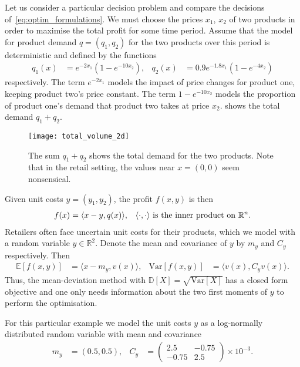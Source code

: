 \documentclass[main.tex]{subfiles}
\begin{document}
\begin{example}
  Let us consider a particular decision problem and compare the
  decisions of~\eqref{eq:optim_formulations}.
  We must choose the prices $x_1$, $x_2$ of two products in order to
  maximise the total profit for some time period.
  Assume that the model for product demand $q=(q_1,q_2)$ for the two products over
  this period is
  deterministic and defined by the functions
  \begin{align}
    q_1(x) &= e^{-2x_1}(1-e^{-10x_2}),
    &q_2(x)&= 0.9e^{-1.8x_1}(1-e^{-4x_2})
  \end{align}
  respectively.
  The term $e^{-2x_1}$  models the impact of price
  changes for product one, keeping product two's price constant.
  The term $1-e^{-10x_2}$ models the proportion of product one's
  demand that product two takes at price $x_2$.
   shows the total demand $q_1+q_2$.
  \begin{figure}[htbp]
    \centering
    \texttt{[image: total\_volume\_2d]}
    \caption{The sum $q_1+q_2$ shows the total demand for the two products.
      Note that in the retail setting, the values near $x=(0,0)$ seem
      nonsensical.}\label{fig:total_volume_2d}
  \end{figure}

  Given unit costs $y=(y_1,y_2)$, the profit $f(x,y)$ is then
  \begin{align}
    f(x)
    &=\langle x-y,q(x) \rangle,
    &\langle \cdot,\cdot \rangle
      \textnormal{ is the inner product on } \mathbb{R}^n.
  \end{align}
  Retailers often face uncertain unit costs for their products, which
  we model with a random variable $y\in\mathbb{R}^2$.
  Denote the mean and covariance of
  $y$ by $m_y$ and $C_y$ respectively. Then
  \begin{align}
    \mathbb{E}[f(x,y)]
    &= \langle x-m_y,v(x) \rangle,
    &\mbox{Var}[f(x,y)]
    &= \langle v(x),C_y v(x) \rangle.
  \end{align}
  Thus, the mean-deviation method with
  $\mathbb{D}[X]=\sqrt{\mbox{Var}[X]}$ has a closed form objective and
  one only needs information about the two first moments of $y$ to perform
  the optimisation.

  For this particular example we model the unit costs $y$ as a log-normally
  distributed random variable with mean and covariance
  \begin{align}
    m_y
    &= (0.5,0.5),
    &C_y
    &=\begin{pmatrix}
      2.5&-0.75\\
      -0.75&2.5
    \end{pmatrix}
             \times 10^{-3}.
  \end{align}


\end{example}
\end{document}
